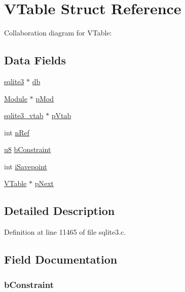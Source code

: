 \hypertarget{struct_v_table}{}\section{V\+Table Struct Reference}
\label{struct_v_table}


Collaboration diagram for V\+Table\+:
\subsection*{Data Fields}
\begin{DoxyCompactItemize}
\item 
\hyperlink{structsqlite3}{sqlite3} $\ast$ \hyperlink{struct_v_table_ad6e663497d2c934364b3bcf07496b30b}{db}
\item 
\hyperlink{struct_module}{Module} $\ast$ \hyperlink{struct_v_table_af1b94c576b400ad171ed0e14e42a3908}{p\+Mod}
\item 
\hyperlink{structsqlite3__vtab}{sqlite3\+\_\+vtab} $\ast$ \hyperlink{struct_v_table_abfe9b838cea369f3646c0bdff58a069e}{p\+Vtab}
\item 
int \hyperlink{struct_v_table_a3c459f9ae278c22b72583c55ca01acb7}{n\+Ref}
\item 
\hyperlink{sqlite3_8c_a74a0f6424ae628af25f23f0a35f6ead3}{u8} \hyperlink{struct_v_table_ab3dcf5546128dfbf22f0a16a83d0729a}{b\+Constraint}
\item 
int \hyperlink{struct_v_table_a174369225809cd2e8afe034fa8926f60}{i\+Savepoint}
\item 
\hyperlink{struct_v_table}{V\+Table} $\ast$ \hyperlink{struct_v_table_a6d0df91e0570a86dd8b2ab2c4ebe9c30}{p\+Next}
\end{DoxyCompactItemize}


\subsection{Detailed Description}


Definition at line 11465 of file sqlite3.\+c.



\subsection{Field Documentation}
\hypertarget{struct_v_table_ab3dcf5546128dfbf22f0a16a83d0729a}{}
\subsubsection[{b\+Constraint}]{ b\+Constraint}\label{struct_v_table_ab3dcf5546128dfbf22f0a16a83d0729a}


